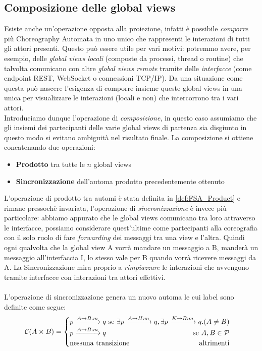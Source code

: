 \subsection{Composizione delle global views}
Esiste anche un'operazione opposta alla proiezione, infatti è possibile \emph{comporre} più Choreography Automata in uno unico che rappresenti le interazioni di tutti gli attori presenti. Questo può essere utile per vari motivi: potremmo avere, per esempio, delle \emph{global views locali} (composte da processi, thread o routine) che talvolta comunicano con altre \emph{global views remote} tramite delle \emph{interfacce} (come endpoint REST, WebSocket o connessioni TCP/IP). Da una situazione come questa può nascere l'esigenza di comporre insieme queste global views in una unica per visualizzare le interazioni (locali e non) che intercorrono tra i vari attori.\\
Introduciamo dunque l'operazione di \emph{composizione}, in questo caso assumiamo che gli insiemi dei partecipanti delle varie global views di partenza sia disgiunto in questo modo si evitano ambiguità nel risultato finale. La composizione si ottiene concatenando due operazioni:
\begin{itemize}
    \item \textbf{Prodotto} tra tutte le $n$ global views
    \item \textbf{Sincronizzazione} dell'automa prodotto precedentemente ottenuto
\end{itemize}
L'operazione di prodotto tra automi è stata definita in \ref{def:FSA_Product} e rimane pressochè invariata, l'operazione di \emph{sincronizzazione} è invece più particolare: abbiamo appurato che le global views comunicano tra loro attraverso le interfacce, possiamo considerare quest'ultime come partecipanti alla coreografia con il solo ruolo di fare \emph{forwarding} dei messaggi tra una view e l'altra. Quindi ogni qualvolta che la global view A vorrà mandare un messaggio a B, manderà un messaggio all'interfaccia I, lo stesso vale per B quando vorrà ricevere messaggi da A. La Sincronizzazione mira proprio a \emph{rimpiazzare} le interazioni che avvengono tramite interfacce con interazioni tra attori effettivi.\\\\
L'operazione di sincronizzazione genera un nuovo automa le cui label sono definite come segue:
\begin{equation*}
    \mathcal{C}(A \times B) =
    \begin{cases}
        p \xrightarrow{A \rightarrow B: m} q \hfill \text{ se } \exists p \xrightarrow{A \rightarrow H: m} q, \exists  p \xrightarrow{K \rightarrow B: m} q. (A \neq B) \\
        p \xrightarrow{A \rightarrow B: m} q \hfill \text{ se } A, B\in \mathcal{P}                                                                                     \\
        \text{nessuna transizione} \hfill \text{altrimenti}
    \end{cases}
\end{equation*}
